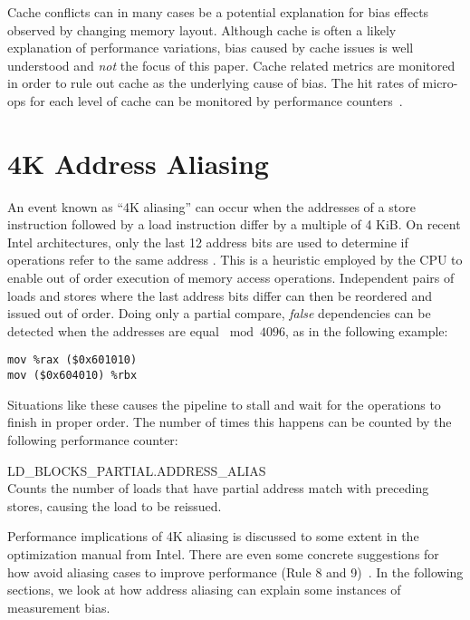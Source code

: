 \documentclass[a4paper,10pt,twocolumn,twoside]{article}
\begin{document}
Cache conflicts can in many cases be a potential explanation for bias effects observed by changing memory layout.
Although cache is often a likely explanation of performance variations, bias caused by cache issues is well understood and \emph{not} the focus of this paper.
Cache related metrics are monitored in order to rule out cache as the underlying cause of bias. 
The hit rates of micro-ops for each level of cache can be monitored by performance counters~\cite{Intel:2012:OptimizationManual}.


\section{4K Address Aliasing}
An event known as “4K aliasing” can occur when the addresses of a store instruction followed by a load instruction differ by a multiple of 4 KiB.
On recent Intel architectures, only the last 12 address bits are used to determine if operations refer to the same address \cite{Intel:2012:OptimizationManual}.
This is a heuristic employed by the CPU to enable out of order execution of memory access operations.
Independent pairs of loads and stores where the last address bits differ can then be reordered and issued out of order.
Doing only a partial compare, \emph{false} dependencies can be detected when the addresses are equal $\bmod 4096$, as in the following example: 
\begin{lstlisting}[language={[x86masm]Assembler}]
mov %rax ($0x601010)
mov ($0x604010) %rbx
\end{lstlisting}
Situations like these causes the pipeline to stall and wait for the operations to finish in proper order.
The number of times this happens can be counted by the following performance counter:
\begin{description}
  \item{LD\_BLOCKS\_PARTIAL.ADDRESS\_ALIAS} \hfill \\
  Counts the number of loads that have partial address match with preceding stores, causing the load to be reissued.
\end{description}
Performance implications of 4K aliasing is discussed to some extent in the optimization manual from Intel. 
There are even some concrete suggestions for how avoid aliasing cases to improve performance (Rule 8 and 9)~\cite{Intel:2012:OptimizationManual}.
In the following sections, we look at how address aliasing can explain some instances of measurement bias.
\end{document}
